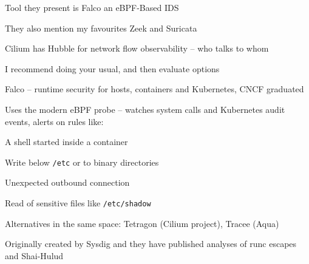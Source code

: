 \documentclass[Screen16to9,17pt]{foils}
\begin{document}
\begin{list2}
\item Tool they present is Falco an eBPF-Based IDS
\item They also mention my favourites Zeek  and Suricata 
\item Cilium has Hubble for network flow observability -- who talks to whom\\
\item I recommend doing your usual, and then evaluate options
\end{list2}



\begin{list1}
\item Falco -- runtime security for hosts, containers and Kubernetes, CNCF graduated\\
\item Uses the modern eBPF probe -- watches system calls and Kubernetes audit events, alerts on rules like:
\begin{list2}
\item A shell started inside a container
\item Write below \verb+/etc+ or to binary directories
\item Unexpected outbound connection
\item Read of sensitive files like \verb+/etc/shadow+
\end{list2}
\item Alternatives in the same space: Tetragon (Cilium project), Tracee (Aqua)
\item Originally created by Sysdig and they have published analyses of runc escapes and Shai-Hulud
\end{list1}


\end{document}
